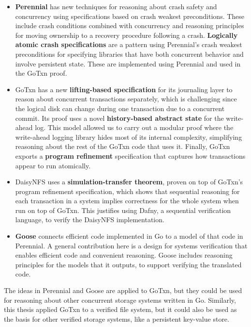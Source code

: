 \begin{itemize}
  \item \textbf{Perennial} has new techniques for reasoning about crash safety
        and concurrency using specifications based on crash weakest
        preconditions. These include crash conditions combined with concurrency
        and reasoning principles for moving ownership to a recovery procedure
        following a crash. \textbf{Logically atomic crash specifications} are a
        pattern using Perennial's crash weakest preconditions for specifying
        libraries that have both concurrent behavior and involve persistent
        state. These are implemented using Perennial and used in the GoTxn
        proof.
  \item GoTxn has a new \textbf{lifting-based specification} for its journaling
        layer to reason about concurrent transactions separately, which is
        challenging since the logical disk can change during one transaction due
        to a concurrent commit. Its proof uses a novel \textbf{history-based
        abstract state} for the write-ahead log. This model allowed us to carry
        out a modular proof where the write-ahead logging library hides most of
        its internal complexity, simplifying reasoning about the rest of the GoTxn
        code that uses it. Finally, GoTxn exports a \textbf{program refinement}
        specification that captures how transactions appear to run atomically.
  \item DaisyNFS uses a \textbf{simulation-transfer theorem}, proven on top of
        GoTxn's program refinement specification, which shows that sequential
        reasoning for each transaction in a system implies correctness for the
        whole system when run on top of GoTxn. This justifies using Dafny, a
        sequential verification language, to verify the DaisyNFS implementation.
  \item \textbf{Goose} connects efficient code implemented in Go to a model of
        that code in Perennial. A general contribution here is a design for
        systems verification that enables efficient code and convenient
        reasoning. Goose includes reasoning principles for the models that it
        outputs, to support verifying the translated code.
\end{itemize}

The ideas in Perennial and Goose are applied to GoTxn, but they could be used
for reasoning about other concurrent storage systems written in Go. Similarly,
this thesis applied GoTxn to a verified file system, but it could also be used
as the basis for other verified storage systems, like a persistent key-value
store.

